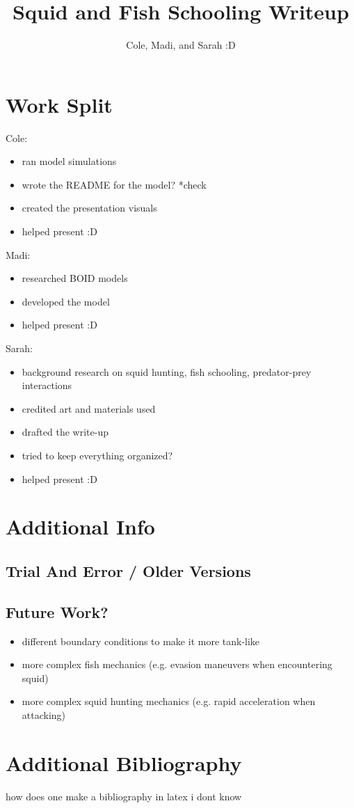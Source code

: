\documentclass[12pt]{article}
\begin{document}
\title{Squid and Fish Schooling Writeup}
\author{Cole, Madi, and Sarah :D}
\maketitle

\section{Work Split}
Cole:
\begin{itemize}
    \item ran model simulations
    \item wrote the README for the model? *check
    \item created the presentation visuals
    \item helped present :D
\end{itemize}
Madi:
\begin{itemize}
    \item researched BOID models
    \item developed the model
    \item helped present :D
\end{itemize}
Sarah:
\begin{itemize}
    \item background research on squid hunting, fish schooling, predator-prey interactions
    \item credited art and materials used
    \item drafted the write-up
    \item tried to keep everything organized?
    \item helped present :D
\end{itemize}

\section{Additional Info}
\subsection{Trial And Error / Older Versions}

\subsection{Future Work?}
\begin{itemize}
    \item different boundary conditions to make it more tank-like
    \item more complex fish mechanics (e.g. evasion maneuvers when encountering squid)
    \item more complex squid hunting mechanics (e.g. rapid acceleration when attacking)
\end{itemize}

\section{Additional Bibliography}
how does one make a bibliography in latex i dont know
\end{document}
